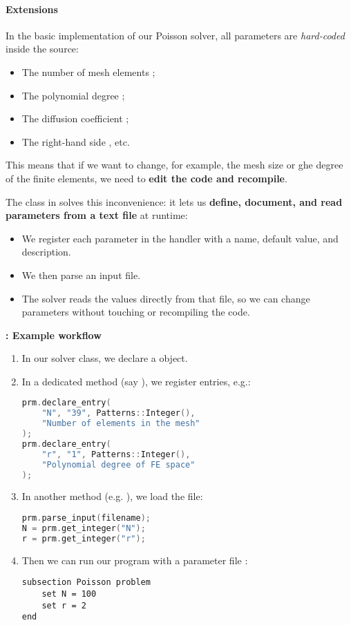 \paragraph{Extensions}

In the basic implementation of our Poisson solver, all parameters are \emph{hard-coded} inside the  source:
\begin{itemize}
    \item The number of mesh elements ;
    \item The polynomial degree ;
    \item The diffusion coefficient ;
    \item The right-hand side , etc.
\end{itemize}
This means that if we want to change, for example, the mesh size or ghe degree of the finite elements, we need to \textbf{edit the code and recompile}.

\highspace
The class  in  solves this inconvenience: it lets us \textbf{define, document, and read parameters from a text file} at runtime:
\begin{itemize}
    \item We register each parameter in the handler with a name, default value, and description.
    \item We then parse an input  file.
    \item The solver reads the values directly from that file, so we can change parameters without touching or recompiling the  code.
\end{itemize}

\begin{flushleft}
    \textcolor{Green3}{ \textbf{: Example workflow}}
\end{flushleft}
\begin{enumerate}
    \item In our solver class, we declare a  object.
    \item In a dedicated method (say ), we register entries, e.g.:
    \begin{lstlisting}[language=C++]
prm.declare_entry(
    "N", "39", Patterns::Integer(),
    "Number of elements in the mesh"
);
prm.declare_entry(
    "r", "1", Patterns::Integer(),
    "Polynomial degree of FE space"
);\end{lstlisting}
    \item In another method (e.g. ), we load the file:
    \begin{lstlisting}[language=C++]
prm.parse_input(filename);
N = prm.get_integer("N");
r = prm.get_integer("r");\end{lstlisting}
    \item Then we can run our program with a parameter file :
    \begin{lstlisting}
subsection Poisson problem
    set N = 100
    set r = 2
end\end{lstlisting}
\end{enumerate}

